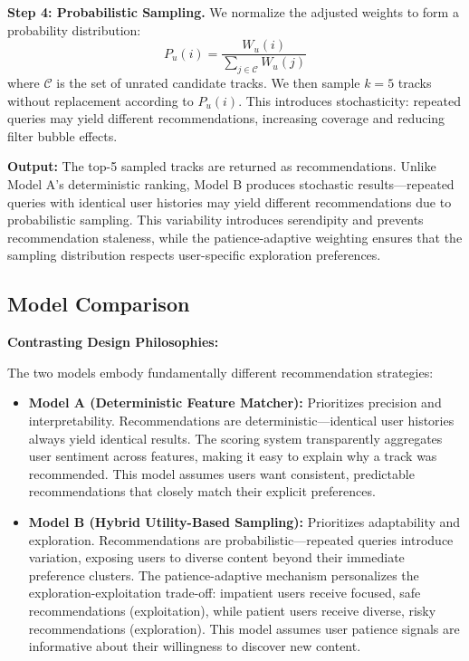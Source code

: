 \documentclass[12pt,a4paper]{article}
\begin{document}
\textbf{Step 4: Probabilistic Sampling.} We normalize the adjusted weights to form a probability distribution:
\begin{equation}
P_u(i) = \frac{W_u(i)}{\sum_{j \in \mathcal{C}} W_u(j)}
\end{equation}
where $\mathcal{C}$ is the set of unrated candidate tracks. We then sample $k=5$ tracks without replacement according to $P_u(i)$. This introduces stochasticity: repeated queries may yield different recommendations, increasing coverage and reducing filter bubble effects.

\textbf{Output:} The top-5 sampled tracks are returned as recommendations. Unlike Model A's deterministic ranking, Model B produces stochastic results—repeated queries with identical user histories may yield different recommendations due to probabilistic sampling. This variability introduces serendipity and prevents recommendation staleness, while the patience-adaptive weighting ensures that the sampling distribution respects user-specific exploration preferences.

\subsection{Model Comparison}

\textbf{Contrasting Design Philosophies:}

The two models embody fundamentally different recommendation strategies:

\begin{itemize}
    \item \textbf{Model A (Deterministic Feature Matcher):} Prioritizes precision and interpretability. Recommendations are deterministic—identical user histories always yield identical results. The scoring system transparently aggregates user sentiment across features, making it easy to explain why a track was recommended. This model assumes users want consistent, predictable recommendations that closely match their explicit preferences.
    
    \item \textbf{Model B (Hybrid Utility-Based Sampling):} Prioritizes adaptability and exploration. Recommendations are probabilistic—repeated queries introduce variation, exposing users to diverse content beyond their immediate preference clusters. The patience-adaptive mechanism personalizes the exploration-exploitation trade-off: impatient users receive focused, safe recommendations (exploitation), while patient users receive diverse, risky recommendations (exploration). This model assumes user patience signals are informative about their willingness to discover new content.
\end{itemize}
\end{document}
